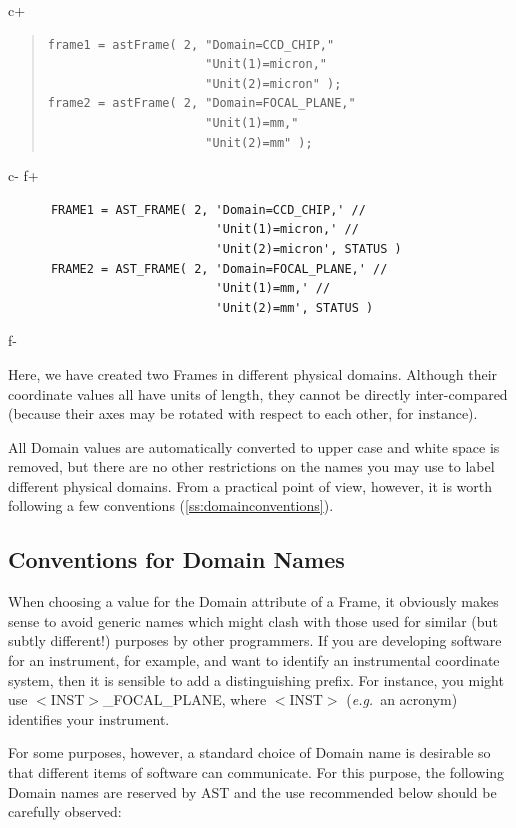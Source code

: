 \documentclass[twoside,11pt]{article}
\newcommand{\secref}[1]{\S\ref{#1}}
\renewcommand{\secref}[1]{\ref{#1}}
\begin{document}
c+
\begin{quote}
\small
\begin{verbatim}
frame1 = astFrame( 2, "Domain=CCD_CHIP,"
                      "Unit(1)=micron,"
                      "Unit(2)=micron" );
frame2 = astFrame( 2, "Domain=FOCAL_PLANE,"
                      "Unit(1)=mm,"
                      "Unit(2)=mm" );
\end{verbatim}
\normalsize
\end{quote}
c-
f+
\small
\begin{verbatim}
      FRAME1 = AST_FRAME( 2, 'Domain=CCD_CHIP,' //
                             'Unit(1)=micron,' //
                             'Unit(2)=micron', STATUS )
      FRAME2 = AST_FRAME( 2, 'Domain=FOCAL_PLANE,' //
                             'Unit(1)=mm,' //
                             'Unit(2)=mm', STATUS )
\end{verbatim}
\normalsize
f-

Here, we have created two Frames in different physical
domains. Although their coordinate values all have units of length,
they cannot be directly inter-compared (because their axes may be
rotated with respect to each other, for instance).

All Domain values are automatically converted to upper case and white
space is removed, but there are no other restrictions on the names you
may use to label different physical domains. From a practical point of
view, however, it is worth following a few conventions
(\secref{ss:domainconventions}).

\subsection{\label{ss:domainconventions}Conventions for Domain Names}

When choosing a value for the Domain attribute of a Frame, it
obviously makes sense to avoid generic names which might clash with
those used for similar (but subtly different!) purposes by other
programmers. If you are developing software for an instrument, for
example, and want to identify an instrumental coordinate system, then
it is sensible to add a distinguishing prefix. For instance, you might
use $<$INST$>$\_FOCAL\_PLANE, where $<$INST$>$ ({\em{e.g.}}\ an
acronym) identifies your instrument.

For some purposes, however, a standard choice of Domain name is
desirable so that different items of software can communicate. For
this purpose, the following Domain names are reserved by AST and the
use recommended below should be carefully observed:
\end{document}
